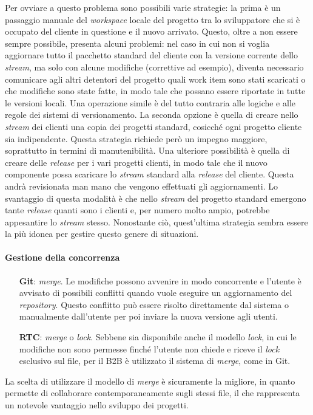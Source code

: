 Per ovviare a questo problema sono possibili varie strategie: la prima è un passaggio manuale del \textit{workspace} locale del progetto tra lo sviluppatore che si è occupato del cliente in questione e il nuovo arrivato. Questo, oltre a non essere sempre possibile, presenta alcuni problemi: nel caso in cui non si voglia aggiornare tutto il pacchetto standard del cliente con la versione corrente dello \textit{stream}, ma solo con alcune modifiche (correttive ad esempio), diventa necessario comunicare agli altri detentori del progetto quali work item sono stati scaricati o che modifiche sono state fatte, in modo tale che possano essere riportate in tutte le versioni locali. Una operazione simile è del tutto contraria alle logiche e alle regole dei sistemi di versionamento. La seconda opzione è quella di creare nello \textit{stream} dei clienti una copia dei progetti standard, cosicché ogni progetto cliente sia indipendente. Questa strategia richiede però un impegno maggiore, soprattutto in termini di manutenibilità. Una ulteriore possibilità è quella di creare delle \textit{release} per i vari progetti clienti, in modo tale che il nuovo componente possa scaricare lo \textit{stream} standard alla \textit{release} del cliente. Questa andrà revisionata man mano che vengono effettuati gli aggiornamenti. Lo svantaggio di questa modalità è che nello \textit{stream} del progetto standard emergono tante \textit{release} quanti sono i clienti e, per numero molto ampio, potrebbe appesantire lo \textit{stream} stesso. Nonostante ciò, quest'ultima strategia sembra essere la più idonea per gestire questo genere di situazioni.

\paragraph*{Gestione della concorrenza}
\begin{itemize}
	\item[\textbf{Git}:] \textit{merge}. Le modifiche possono avvenire in modo concorrente e l'utente è avvisato di possibili conflitti quando vuole eseguire un aggiornamento del \textit{repository}. Questo conflitto può essere risolto direttamente dal sistema o manualmente dall'utente per poi inviare la nuova versione agli utenti.
	\item[\textbf{RTC}:] \textit{merge} o \textit{lock}. Sebbene sia disponibile anche il modello \textit{lock}, in cui le modifiche non sono permesse finché l'utente non chiede e riceve il \textit{lock} esclusivo sul file, per il B2B è utilizzato il sistema di \textit{merge}, come in Git.
\end{itemize}
La scelta di utilizzare il modello di \textit{merge} è sicuramente la migliore, in quanto permette di collaborare contemporaneamente sugli stessi file, il che rappresenta un notevole vantaggio nello sviluppo dei progetti.

